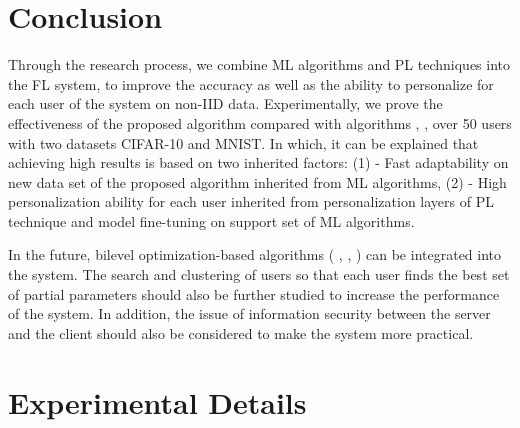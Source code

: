 \documentclass[runningheads]{llncs}
\begin{document}
\section{Conclusion}

Through the research process, we combine ML algorithms and PL techniques into the FL system, to improve the accuracy as well as the ability to personalize for each user of the system on non-IID data. Experimentally, we prove the effectiveness of the proposed algorithm  compared with algorithms , ,  over 50 users with two datasets CIFAR-10 and MNIST. In which, it can be explained that achieving high results is based on two inherited factors: (1) - Fast adaptability on new data set of the proposed algorithm inherited from ML algorithms, (2) - High personalization ability for each user inherited from personalization layers of PL technique and model fine-tuning on support set of ML algorithms.

In the future, bilevel optimization-based algorithms ( \cite{finn2017model},  \cite{rajeswaran2019meta}, ) can be integrated into the system. The search and clustering of users so that each user finds the best set of partial parameters should also be further studied to increase the performance of the system. In addition, the issue of information security between the server and the client should also be considered to make the system more practical.

%
%
%
%
%



\appendix
\section{Experimental Details}
\label{appendix}
\end{document}
